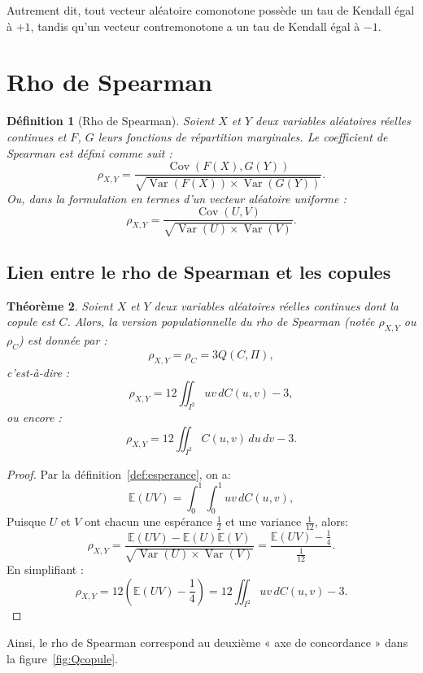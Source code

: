 \documentclass[a4paper,11pt]{amsbook}
\numberwithin{equation}{chapter}
\newtheorem{theoreme}			     {Théorème}	[chapter]
\newtheorem{definition}	[theoreme]   {Définition}
\theoremstyle{definition}
\begin{document}
Autrement dit, tout vecteur aléatoire comonotone possède un tau de Kendall égal à \(+1\), tandis qu’un vecteur contremonotone a un tau de Kendall égal à \(-1\).

\section{Rho de Spearman}

\begin{definition}[Rho de Spearman]\label{def:rho}
Soient \( X \) et \( Y \) deux variables aléatoires réelles continues et \( F \), \( G \) leurs fonctions de répartition marginales.  
Le coefficient de Spearman est défini comme suit :
\[
\rho_{X,Y} = \frac{\operatorname{Cov}(F(X), G(Y))}{\sqrt{\operatorname{Var}(F(X)) \times \operatorname{Var}(G(Y))}}.
\]
Ou, dans la formulation en termes d'un vecteur aléatoire uniforme :
\[
\rho_{X,Y} = \frac{\operatorname{Cov}(U, V)}{\sqrt{\operatorname{Var}(U) \times \operatorname{Var}(V)}}.
\]
\end{definition}

\subsection{Lien entre le rho de Spearman et les copules}

\begin{theoreme}\label{thm:rho}
Soient \( X \) et \( Y \) deux variables aléatoires réelles continues dont la copule est \( C \).  
Alors, la version populationnelle du rho de Spearman (notée \( \rho_{X,Y} \) ou \( \rho_C \)) est donnée par :
\[
\rho_{X,Y} = \rho_C = 3Q(C, \Pi),
\]
c'est-à-dire :
\[
\rho_{X,Y} = 12 \iint_{I^2} uv \, dC(u,v) - 3,
\]
ou encore :
\[
\rho_{X,Y} = 12 \iint_{I^2} C(u,v) \, du \, dv - 3.
\]
\end{theoreme}

\begin{proof}
 Par la définition~\ref{def:esperance}, on a:
\[
\mathbb{E}(UV) = \int_0^1 \int_0^1 uv \, dC(u,v),
\]
Puisque \( U \) et \( V \) ont chacun une espérance \( \frac{1}{2} \) et une variance \( \frac{1}{12} \), alors:
\[
\rho_{X,Y} = \frac{\mathbb{E}(UV) - \mathbb{E}(U)\mathbb{E}(V)}{\sqrt{\operatorname{Var}(U) \times \operatorname{Var}(V)}} = \frac{\mathbb{E}(UV) - \frac{1}{4}}{\frac{1}{12}}.
\]
En simplifiant :
\[
\rho_{X,Y} = 12 \left( \mathbb{E}(UV) - \frac{1}{4} \right) = 12 \iint_{I^2} uv \, dC(u,v) - 3.
\]
\end{proof}
Ainsi, le rho de Spearman correspond au deuxième « axe de concordance » dans la figure~\ref{fig:Qcopule}.
\end{document}
